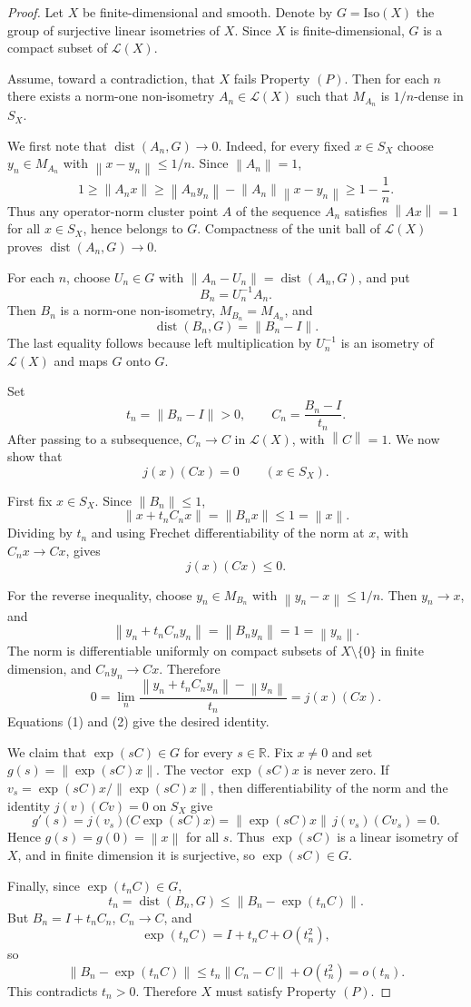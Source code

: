 \documentclass[11pt]{article}
\newcommand{\R}{\mathbb{R}}
\newcommand{\SX}{S_X}
\newcommand{\Iso}{\mathrm{Iso}(X)}
\newcommand{\dist}{\operatorname{dist}}
\newcommand{\Lin}{\mathcal{L}(X)}
\newcommand{\norm}[1]{\left\lVert #1 \right\rVert}
\begin{document}
\begin{proof}
Let \(X\) be finite-dimensional and smooth.  Denote by \(G=\Iso\) the group of
surjective linear isometries of \(X\).  Since \(X\) is finite-dimensional,
\(G\) is a compact subset of \(\Lin\).

Assume, toward a contradiction, that \(X\) fails Property \((P)\).  Then for
each \(n\) there exists a norm-one non-isometry \(A_n\in \Lin\) such that
\(M_{A_n}\) is \(1/n\)-dense in \(\SX\).

We first note that \(\dist(A_n,G)\to 0\).  Indeed, for every fixed
\(x\in \SX\) choose \(y_n\in M_{A_n}\) with \(\norm{x-y_n}\le 1/n\).  Since
\(\norm{A_n}=1\),
\[
  1\ge \norm{A_nx}\ge \norm{A_ny_n}-\norm{A_n}\norm{x-y_n}
    \ge 1-\frac1n .
\]
Thus any operator-norm cluster point \(A\) of the sequence \(A_n\) satisfies
\(\norm{Ax}=1\) for all \(x\in \SX\), hence belongs to \(G\).  Compactness of
the unit ball of \(\Lin\) proves \(\dist(A_n,G)\to 0\).

For each \(n\), choose \(U_n\in G\) with
\(\norm{A_n-U_n}=\dist(A_n,G)\), and put
\[
  B_n=U_n^{-1}A_n .
\]
Then \(B_n\) is a norm-one non-isometry, \(M_{B_n}=M_{A_n}\), and
\[
  \dist(B_n,G)=\norm{B_n-I}.
\]
The last equality follows because left multiplication by \(U_n^{-1}\) is an
isometry of \(\Lin\) and maps \(G\) onto \(G\).

Set
\[
  t_n=\norm{B_n-I}>0,\qquad C_n=\frac{B_n-I}{t_n}.
\]
After passing to a subsequence, \(C_n\to C\) in \(\Lin\), with
\(\norm{C}=1\).  We now show that
\[
  j(x)(Cx)=0\qquad (x\in \SX).
\]

First fix \(x\in \SX\).  Since \(\norm{B_n}\le 1\),
\[
  \norm{x+t_n C_nx}=\norm{B_nx}\le 1=\norm{x}.
\]
Dividing by \(t_n\) and using Frechet differentiability of the norm at \(x\),
with \(C_nx\to Cx\), gives
\[
  j(x)(Cx)\le 0. \tag{1}
\]

For the reverse inequality, choose \(y_n\in M_{B_n}\) with
\(\norm{y_n-x}\le 1/n\).  Then \(y_n\to x\), and
\[
  \norm{y_n+t_n C_ny_n}=\norm{B_ny_n}=1=\norm{y_n}.
\]
The norm is differentiable uniformly on compact subsets of \(X\setminus\{0\}\)
in finite dimension, and \(C_ny_n\to Cx\).  Therefore
\[
  0
  =\lim_n
    \frac{\norm{y_n+t_n C_ny_n}-\norm{y_n}}{t_n}
  =j(x)(Cx). \tag{2}
\]
Equations (1) and (2) give the desired identity.

We claim that \(\exp(sC)\in G\) for every \(s\in\R\).  Fix \(x\ne 0\) and set
\(g(s)=\norm{\exp(sC)x}\).  The vector \(\exp(sC)x\) is never zero.  If
\(v_s=\exp(sC)x/\norm{\exp(sC)x}\), then differentiability of the norm and the
identity \(j(v)(Cv)=0\) on \(\SX\) give
\[
  g'(s)
   = j(v_s)\bigl(C\exp(sC)x\bigr)
   = \norm{\exp(sC)x}\,j(v_s)(Cv_s)
   =0 .
\]
Hence \(g(s)=g(0)=\norm{x}\) for all \(s\).  Thus \(\exp(sC)\) is a linear
isometry of \(X\), and in finite dimension it is surjective, so \(\exp(sC)\in
G\).

Finally, since \(\exp(t_n C)\in G\),
\[
  t_n=\dist(B_n,G)\le \norm{B_n-\exp(t_n C)}.
\]
But \(B_n=I+t_n C_n\), \(C_n\to C\), and
\[
  \exp(t_n C)=I+t_n C+O(t_n^2),
\]
so
\[
  \norm{B_n-\exp(t_n C)}
  \le t_n\norm{C_n-C}+O(t_n^2)=o(t_n).
\]
This contradicts \(t_n>0\).  Therefore \(X\) must satisfy Property \((P)\).
\end{proof}
\end{document}
